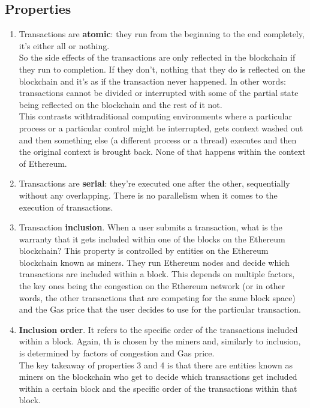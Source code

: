 \subsection*{Properties}

\begin{enumerate}

    \item Transactions are \textbf{atomic}: they run from the beginning to the end completely, it's either all or nothing.\\

    So the side effects of the transactions are only reflected in the blockchain if they run to completion.
    If they don't, nothing that they do is reflected on the blockchain and it's as if the transaction never happened.
    In other words: transactions cannot be divided or interrupted with some of the partial state being reflected on the blockchain and the rest of it not.\\

    This contrasts withtraditional computing environments where a particular process or a particular control might be interrupted, gets context washed out and then something else (a different process or a thread) executes and then the original context is brought back.
    None of that happens within the context of Ethereum.\\

    \item Transactions are \textbf{serial}: they're executed one after the other, sequentially without any overlapping.
    There is no parallelism when it comes to the execution of transactions.

    \item Transaction \textbf{inclusion}.
    When a user submits a transaction, what is the warranty that it gets included within one of the blocks on the Ethereum blockchain?
    This property is controlled by entities on the Ethereum blockchain known as miners.
    They run Ethereum nodes and decide which transactions are included within a block.
    This depends on multiple factors, the key ones being the congestion on the Ethereum network (or in other words, the other transactions that are competing for the same block space) and the Gas price that the user decides to use for the particular transaction.

    \item\textbf{Inclusion order}.
    It refers to the specific order of the transactions included within a block.
    Again, th is chosen by the miners and, similarly to inclusion, is determined by factors of congestion and Gas price.\\

    The key takeaway of properties 3 and 4 is that there are entities known as miners on the blockchain who get to decide which transactions get included within a certain block and the specific order of the transactions within that block.    

\end{enumerate}


